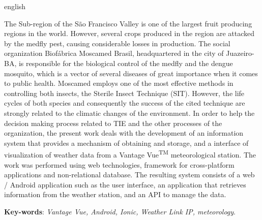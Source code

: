 \begin{resumo}[Abstract]
\begin{otherlanguage*}{english}

The Sub-region of the São Francisco Valley is one of the largest fruit producing regions in the world. However, several crops produced in the region are attacked by the medfly pest, causing considerable losses in production. The social organization Biofábrica Moscamed Brasil, headquartered in the city of Juazeiro-BA, is responsible for the biological control of the medfly and the dengue mosquito, which is a vector of several diseases of great importance when it comes to public health. Moscamed employs one of the most effective methods in controlling both insects, the Sterile Insect Technique (SIT). However, the life cycles of both species and consequently the success of the cited technique are strongly related to the climatic changes of the environment. In order to help the decision making process related to TIE and the other processes of the organization, the present work deals with the development of an information system that provides a mechanism of obtaining and storage, and a interface of visualization of weather data from a Vantage Vue\textsuperscript{TM} meteorological station. The work was performed using web technologies, framework for cross-platform applications and non-relational database. The resulting system consists of a web / Android application such as the user interface, an application that retrieves information from the weather station, and an API to manage the data.
	
	\vspace{\onelineskip}

	\noindent
	\textbf{Key-words}: \textit{Vantage Vue, Android, Ionic, Weather Link IP, meteorology}.

 \end{otherlanguage*}
\end{resumo}


